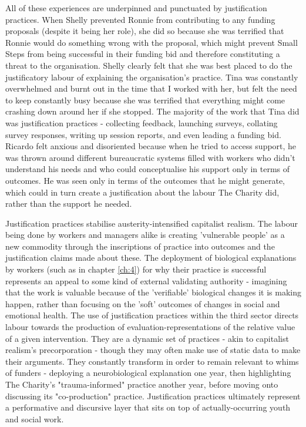 All of these experiences are underpinned and punctuated by justification practices. When Shelly prevented Ronnie from contributing to any funding proposals (despite it being her role), she did so because she was terrified that Ronnie would do something wrong with the proposal,  which might prevent Small Steps from being successful in their funding bid and therefore constituting a threat to the organisation. Shelly clearly felt that she was best placed to do the justificatory labour of explaining the organisation's practice. Tina was constantly overwhelmed and burnt out in the time that I worked with her, but felt the need to keep constantly busy because she was terrified that everything might come crashing down around her if she stopped. The majority of the work that Tina did was justification practices - collecting feedback, launching surveys, collating survey responses, writing up session reports, and even leading a funding bid. Ricardo felt anxious and disoriented because when he tried to access support, he was thrown around different bureaucratic systems filled with workers who didn't understand his needs and who could conceptualise his support only in terms of outcomes. He was seen only in terms of the outcomes that he might generate, which could in turn create a justification about the labour The Charity did, rather than the support he needed.

Justification practices stabilise austerity-intensified capitalist realism. The labour being done by workers and managers alike is creating 'vulnerable people' as a new commodity through the inscriptions of practice into outcomes and the justification claims made about these. The deployment of biological explanations by workers (such as in chapter \ref{ch:4}) for why their practice is successful represents an appeal to some kind of external validating authority - imagining that the work is valuable because of the 'verifiable' biological changes it is making happen, rather than focusing on the 'soft' outcomes of changes in social and emotional health. The use of justification practices within the third sector directs labour towards the production of evaluation-representations of the relative value of a given intervention. They are a dynamic set of practices - akin to capitalist realism's precorporation - though they may often make use of static data to make their arguments. They constantly transform in order to remain relevant to whims of funders - deploying a neurobiological explanation one year, then highlighting The Charity's "trauma-informed" practice another year, before moving onto discussing its "co-production" practice. Justification practices ultimately represent a performative and discursive layer that sits on top of actually-occurring youth and social work.

